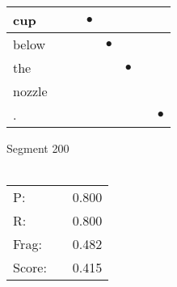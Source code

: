 \documentclass[landscape]{article}
\newcommand{\ssp}{\hspace{2pt}}
\newcommand{\mex}{\cellcolor{g}$\bullet$}
\begin{document}
\begin{tabular}{|l|p{10pt}|p{10pt}|p{10pt}|p{10pt}|p{10pt}|p{10pt}|p{10pt}|}
\hline
\ssp \cellcolor{ref2}cup \ssp&\hspace{2pt}&\hspace{2pt}&\hspace{2pt}\mex&\hspace{2pt}&\hspace{2pt}&\hspace{2pt}&\hspace{2pt}\\
\hline
\ssp \cellcolor{ref3}below \ssp&\hspace{2pt}&\hspace{2pt}&\hspace{2pt}&\hspace{2pt}\mex&\hspace{2pt}&\hspace{2pt}&\hspace{2pt}\\
\hline
\ssp \cellcolor{ref4}the \ssp&\hspace{2pt}&\hspace{2pt}&\hspace{2pt}&\hspace{2pt}&\hspace{2pt}\mex&\hspace{2pt}&\hspace{2pt}\\
\hline
\ssp nozzle \ssp&\hspace{2pt}&\hspace{2pt}&\hspace{2pt}&\hspace{2pt}&\hspace{2pt}&\hspace{2pt}&\hspace{2pt}\\
\hline
\ssp \cellcolor{ref6}. \ssp&\hspace{2pt}&\hspace{2pt}&\hspace{2pt}&\hspace{2pt}&\hspace{2pt}&\hspace{2pt}&\hspace{2pt}\mex\\
\hline
\end{tabular}

\vspace{6pt}
\noindent Segment 200\\\\
\noindent\begin{tabular}{lm{12pt}r}
\hline
P:&&0.800\\
R:&&0.800\\
Frag:&&0.482\\
Score:&&0.415\\
\end{tabular}
\end{document}
